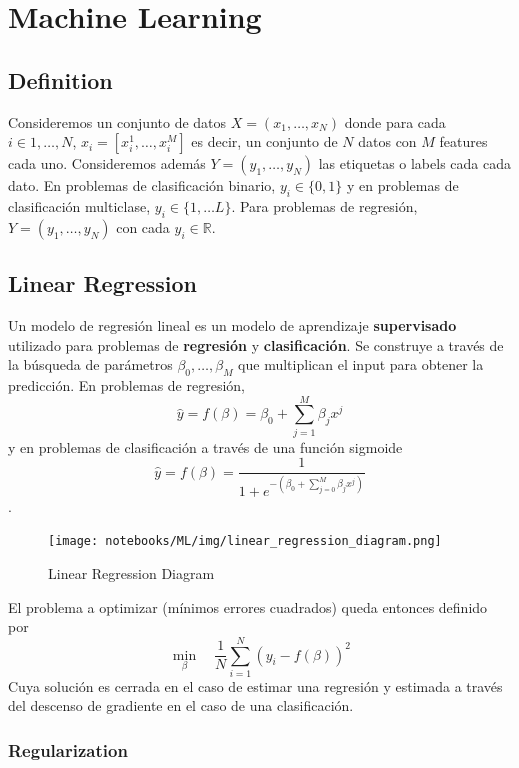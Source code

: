 \chapter{Machine Learning}

\section{Definition}

Consideremos un conjunto de datos $X = (x_1, \dots , x_N)$ donde para cada $i \in {1, \dots, N}$, $x_i = [x_{i}^1 , \dots, x_{i}^M]$ es decir, un conjunto de $N$ datos con $M$ features cada uno. Consideremos además $Y = (y_1, \dots , y_N)$ las etiquetas o labels cada cada dato. En problemas de clasificación binario, $y_i \in \{ 0, 1\}$ y en problemas de clasificación multiclase, $y_i \in \{1, \dots L\}$. Para problemas de regresión, $Y = (y_1, \dots , y_N)$ con cada $y_i \in \mathbb{R}$.

\section{Linear Regression}

Un modelo de regresión lineal es un modelo de aprendizaje \textbf{supervisado} utilizado para problemas de \textbf{regresión} y \textbf{clasificación}. Se construye a través de la búsqueda de parámetros $\beta_0, \dots, \beta_M$ que multiplican el input para obtener la predicción. En problemas de regresión, 
$$\hat{y} = f(\beta) = \beta_0 + \sum_{j=1}^M \beta_j x^j$$
y en problemas de clasificación a través de una función sigmoide 
$$\hat{y} = f(\beta) = \frac{1}{1+e^{- (\beta_0 + \sum_{j=0}^M \beta_j x^j)}}$$.

\begin{figure}[H]
    \center
    \texttt{[image: notebooks/ML/img/linear\_regression\_diagram.png]}
    \caption{Linear Regression Diagram}
\end{figure}

El problema a optimizar (mínimos errores cuadrados) queda entonces definido por 
$$\min_{\beta} \quad \frac{1}{N}\sum_{i=1}^N(y_i - f(\beta))^2$$
Cuya solución es cerrada en el caso de estimar una regresión y estimada a través del descenso de gradiente en el caso de una clasificación. 

\subsection{Regularization}

